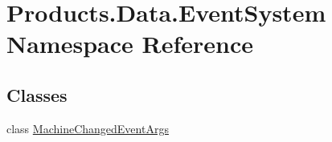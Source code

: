 \hypertarget{namespace_products_1_1_data_1_1_event_system}{}\section{Products.\+Data.\+Event\+System Namespace Reference}
\label{namespace_products_1_1_data_1_1_event_system}
\subsection*{Classes}
\begin{DoxyCompactItemize}
\item 
class \hyperlink{class_products_1_1_data_1_1_event_system_1_1_machine_changed_event_args}{Machine\+Changed\+Event\+Args}
\end{DoxyCompactItemize}

